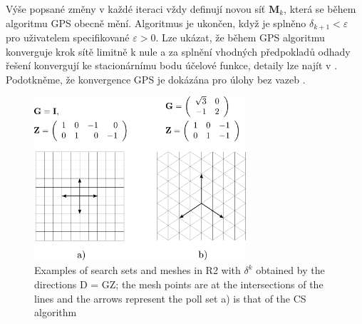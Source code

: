 Výše popsané změny v každé iteraci vždy definují novou síť $ \mathbf{M} _k$, která se během algoritmu GPS obecně mění. Algoritmus je ukončen, když je splněno $ \delta_{k+1} < \varepsilon $ pro uživatelem specifikované $ \varepsilon > 0 $. Lze ukázat, že během GPS algoritmu konverguje krok sítě limitně k nule a za splnění vhodných předpokladů odhady řešení konvergují ke stacionárnímu bodu účelové funkce, detaily lze najít v \cite{BBO-textbook}. Podotkněme, že konvergence GPS je dokázána pro úlohy bez vazeb \cite{BBO-textbook}.

\begin{figure}[H]
	\centering
	\includegraphics[width=0.7\textwidth]{figures/gps.pdf}
	\caption{Examples of search sets and meshes in R2 with
		$\delta^k$  obtained by the directions D = GZ; the mesh points
		are at the intersections of the lines and the arrows represent
		the poll set a) is that of the CS algorithm}
	\label{fig:gps}
\end{figure}


